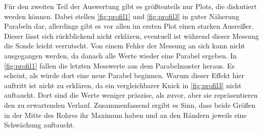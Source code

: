 Für den zweiten Teil der Auswertung gibt es größtenteils nur Plots, die diskutiert werden können.
Dabei stellen \autoref{fig:profil1} und \autoref{fig:profil3} in guter Näherung Parabeln dar, allerdings gibt es vor allen im ersten Plot einen starken Ausreißer.
Dieser lässt sich rückblickend nicht erklären, eventuell ist während dieser Messung die Sonde leicht verrutscht. Von einem Fehler der Messung an sich kann nicht ausgegangen werden, da danach alle Werte wieder eine Parabel ergeben.
In \autoref{fig:profil1} fallen die letzten Messwerte aus dem Parabelmuster heraus. Es scheint, als würde dort eine neue Parabel beginnen.
Warum dieser Effekt hier auftritt ist nicht zu erklären, da ein vergleichbarer Knick in \autoref{fig:profil3} nicht auftaucht. 
Dort sind die Werte weniger präszise, als zuvor, aber sie repräsentieren den zu erwartenden Verlauf. 
Zusammenfassend ergibt es Sinn, dass beide Größen in der Mitte des Rohres ihr Maximum haben und an den Rändern jeweils eine Schwächung auftaucht.